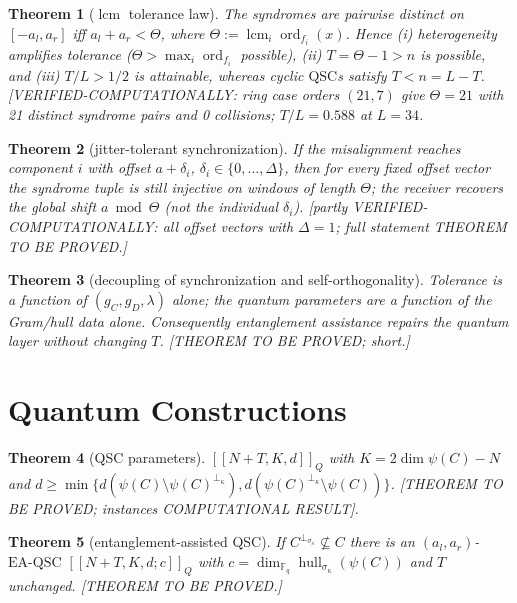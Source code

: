 \documentclass[11pt]{article}
\newtheorem{theorem}{Theorem}[section]
\theoremstyle{definition}
\theoremstyle{remark}
\theoremstyle{plain}
\newcommand{\Fq}{\mathbb{F}_q}
\newcommand{\hull}{\operatorname{hull}}
\newcommand{\ord}{\operatorname{ord}}
\newcommand{\lcm}{\operatorname{lcm}}
\newcommand{\perpsig}{^{\perp_{\sigma_\kappa}}}
\newcommand{\EAQSC}{\mathrm{EA\text{-}QSC}}
\newcommand{\Tol}{T}
\newcommand{\Th}{\Theta}
\begin{document}
\begin{theorem}[$\lcm$ tolerance law]\label{thm:lcm}
The syndromes are pairwise distinct on $[-a_l,a_r]$ iff
$a_l+a_r<\Th$, where $\Th:=\lcm_i\ord_{f_i}(x)$. Hence
(i) heterogeneity amplifies tolerance ($\Th>\max_i\ord_{f_i}$ possible),
(ii) $\Tol=\Th-1>n$ is possible, and (iii) $\Tol/L>1/2$ is attainable, whereas cyclic
$\mathrm{QSC}$s satisfy $\Tol<n=L-\Tol$.
\textnormal{[VERIFIED-COMPUTATIONALLY: ring case orders $(21,7)$ give $\Th=21$ with
21 distinct syndrome pairs and 0 collisions; $T/L=0.588$ at $L=34$.}
\end{theorem}

\begin{theorem}[jitter-tolerant synchronization]\label{thm:jitter}
If the misalignment reaches component $i$ with offset $a+\delta_i$,
$\delta_i\in\{0,\dots,\Delta\}$, then for every fixed offset vector the syndrome tuple is
still injective on windows of length $\Th$; the receiver recovers the global shift
$a\bmod\Th$ (not the individual $\delta_i$).
\textnormal{[partly VERIFIED-COMPUTATIONALLY: all offset vectors with $\Delta=1$; full
statement THEOREM TO BE PROVED.]}
\end{theorem}

\begin{theorem}[decoupling of synchronization and self-orthogonality]\label{thm:decouple}
Tolerance is a function of $(g_C,g_D,\lambda)$ alone; the quantum parameters are a function
of the Gram/hull data alone. Consequently entanglement assistance repairs the quantum layer
without changing $\Tol$.
\textnormal{[THEOREM TO BE PROVED; short.]}
\end{theorem}

\section{Quantum Constructions}\label{sec:quantum}

\begin{theorem}[QSC parameters]\label{thm:qsc}
$[[N+\Tol,K,d]]_Q$ with $K=2\dim\psi(C)-N$ and
$d\ge\min\{d(\psi(C)\setminus\psi(C)^{\perp_\kappa}),
d(\psi(C)^{\perp_\kappa}\setminus\psi(C))\}$.
\textnormal{[THEOREM TO BE PROVED; instances COMPUTATIONAL RESULT]}.
\end{theorem}

\begin{theorem}[entanglement-assisted QSC]\label{thm:eaqsc}
If $C\perpsig\not\subseteq C$ there is an $(a_l,a_r)$-$\EAQSC$
$[[N+\Tol,K,d;c]]_Q$ with $c=\dim_{\Fq}\hull_{\sigma_\kappa}(\psi(C))$ and $\Tol$ unchanged.
\textnormal{[THEOREM TO BE PROVED.]}
\end{theorem}
\end{document}
